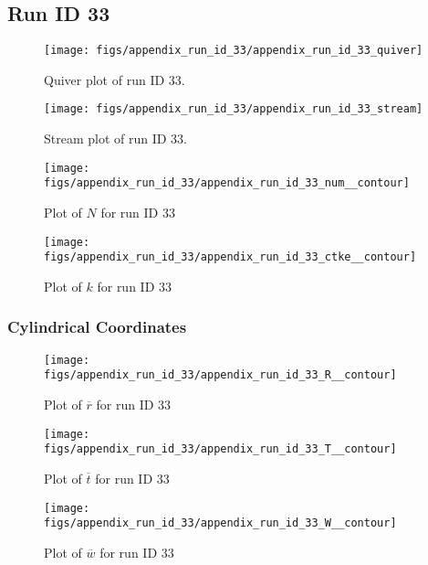 \subsection{Run ID 33}
\begin{figure}[H]
\centering
\texttt{[image: figs/appendix\_run\_id\_33/appendix\_run\_id\_33\_quiver]}
\caption{Quiver plot of run ID 33.}
\label{fig:appendix_run_id_33_quiver}
\end{figure}


\begin{figure}[H]
\centering
\texttt{[image: figs/appendix\_run\_id\_33/appendix\_run\_id\_33\_stream]}
\caption{Stream plot of run ID 33.}
\label{fig:appendix_run_id_33_stream}
\end{figure}


\begin{figure}[H]
\centering
\texttt{[image: figs/appendix\_run\_id\_33/appendix\_run\_id\_33\_num\_\_contour]}
\caption{Plot of $N$ for run ID 33}
\label{fig:appendix_run_id_33_num__contour}
\end{figure}


\begin{figure}[H]
\centering
\texttt{[image: figs/appendix\_run\_id\_33/appendix\_run\_id\_33\_ctke\_\_contour]}
\caption{Plot of $k$ for run ID 33}
\label{fig:appendix_run_id_33_ctke__contour}
\end{figure}


\subsubsection{Cylindrical Coordinates}
\begin{figure}[H]
\centering
\texttt{[image: figs/appendix\_run\_id\_33/appendix\_run\_id\_33\_R\_\_contour]}
\caption{Plot of $\overline{r}$ for run ID 33}
\label{fig:appendix_run_id_33_R__contour}
\end{figure}


\begin{figure}[H]
\centering
\texttt{[image: figs/appendix\_run\_id\_33/appendix\_run\_id\_33\_T\_\_contour]}
\caption{Plot of $\overline{t}$ for run ID 33}
\label{fig:appendix_run_id_33_T__contour}
\end{figure}


\begin{figure}[H]
\centering
\texttt{[image: figs/appendix\_run\_id\_33/appendix\_run\_id\_33\_W\_\_contour]}
\caption{Plot of $\overline{w}$ for run ID 33}
\label{fig:appendix_run_id_33_W__contour}
\end{figure}


